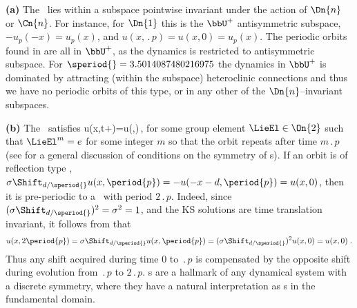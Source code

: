 {\bf (a)} The \po\ lies
within a subspace pointwise invariant under the action of
$\Dn{n}$ or $\Cn{n}$. For instance, for $\Dn{1}$ this is the
$\bbU^+$ antisymmetric subspace, $-u_p(-x) = u_p(x)$, and
$u(x,\period{p}) = u(x,0) = u_p(x)$. The periodic orbits
found in  are
all in $\bbU^+$, as the dynamics is restricted to
antisymmetric subspace. For $\speriod{}=3.5014087480216975$ the dynamics in $\bbU^+$
is dominated by attracting (within the subspace)
heteroclinic connections and thus we have no periodic orbits
of this type, or in any other of the $\Dn{n}$--invariant
subspaces.

{\bf (b)} The \po\ satisfies
\beq
	 u(x,t+)=\LieEl u(\conf,\zeit)\,,
	\label{eq:POspattemp}
\eeq
for some group element $\LieEl\in \On{2}$ such that
$\LieEl^m=e$ for some integer $m$ so that the orbit repeats
after time $m \period{p}$ (see
 for a general discussion of
conditions on the symmetry of \po s).
If an orbit is of reflection type ,
$\Refl\Shift_{\shift/\speriod{}} u(x,\period{p}) =
-u(-x-\shift,\period{p}) = u(x,0)$, then it is pre-periodic
to a \po\ with period $2\period{p}$. Indeed, since
$(\Refl\Shift_{\shift/\speriod{}})^2 = \Refl^2 = 1$, and the KS
solutions are time translation invariant, it follows from
 that
\[
  u(x,2\period{p}) = \Refl\Shift_{\shift/\speriod{}} u(x,\period{p}) =
  (\Refl\Shift_{\shift/\speriod{}})^2 u(x,0) = u(x,0)\;.
\]
Thus any shift acquired during time $0$ to
$\period{p}$ is compensated by the opposite shift during
evolution from $\period{p}$ to $2 \period{p}$.
\Ppo s are a hallmark of any dynamical system
with a discrete symmetry, where they have a natural
interpretation as \po s in the fundamental
domain.




